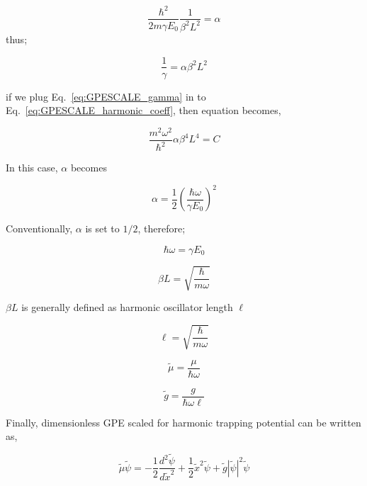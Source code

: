 \documentclass[a4paper,times,hidelinks,12pt]{article}
\begin{document}
\begin{equation}
\label{eq:GPESCALE_alpha}
    \frac{\hbar^2}{2m\gamma E_0} \frac{1}{\beta^2 L^2} = \alpha
\end{equation}
thus;

\begin{equation}
\label{eq:GPESCALE_gamma}
     \frac{1}{\gamma} = \alpha \beta^2 L^2
\end{equation}

\noindent if we plug Eq.~\eqref{eq:GPESCALE_gamma} in to Eq.~\eqref{eq:GPESCALE_harmonic_coeff}, then equation becomes,

\begin{equation}
\label{eq:GPESCALE_harmonic_coeff_2}
    \frac{m^2\omega^2}{\hbar^2} \alpha \beta^4 L^4 = C 
\end{equation} 

\noindent In this case, $\alpha$ becomes

$$ \alpha =  \frac{1}{2} \left(\frac{\hbar \omega}{\gamma E_0}\right)^2 $$

\noindent Conventionally, $\alpha$ is set to $1/2$, therefore;

$$ \hbar \omega = \gamma E_0 $$

$$ \beta L = \sqrt{\frac{\hbar}{m\omega}} $$ 

\noindent $ \beta L $ is generally defined as harmonic oscillator length $\ell$

$$ \ell = \sqrt{\frac{\hbar}{m\omega}} $$ 

$$ \widetilde{\mu} = \frac{\mu}{\hbar \omega} $$ 

$$ \widetilde{g} = \frac{g}{\hbar \omega \ell} $$

\noindent Finally, dimensionless GPE scaled for harmonic trapping potential can be written as,

$$\widetilde{\mu} \widetilde{\psi} = -\frac{1}{2}\frac{d^2\widetilde{\psi}}{d\widetilde{x}^2} + \frac{1}{2}\widetilde{x}^2\widetilde{\psi} + \widetilde{g}|\widetilde{\psi}|^2 \widetilde{\psi} $$
\end{document}
